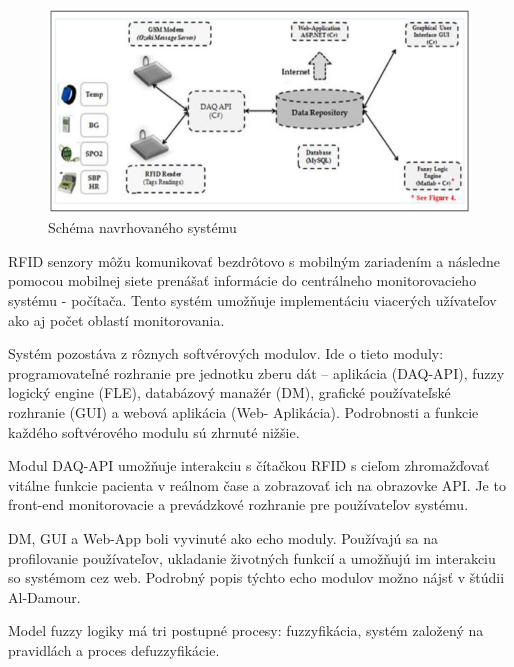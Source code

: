 \begin{figure}[H]
\centering
\includegraphics[scale=0.75]{scheme-fuzzy.png}
\caption{Schéma navrhovaného systému \cite{2019}}
\label{schema}
\end{figure}

RFID senzory môžu komunikovať bezdrôtovo s mobilným zariadením a následne pomocou mobilnej siete prenášať informácie do centrálneho monitorovacieho systému - počítača. Tento systém umožňuje implementáciu viacerých užívateľov ako aj počet oblastí monitorovania. \cite{2019} 

Systém pozostáva z rôznych softvérových modulov. Ide o tieto moduly: programovateľné rozhranie pre jednotku zberu dát – aplikácia (DAQ-API), fuzzy logický engine (FLE), databázový manažér (DM), grafické používateľské rozhranie (GUI) a webová aplikácia (Web- Aplikácia). Podrobnosti a funkcie každého softvérového modulu sú zhrnuté nižšie. \cite{2019}

Modul DAQ-API umožňuje interakciu s čítačkou RFID s cieľom zhromažďovať vitálne funkcie pacienta v reálnom čase a zobrazovať ich na obrazovke API. Je to front-end monitorovacie a prevádzkové rozhranie pre používateľov systému.\cite{2019}

DM, GUI a Web-App boli vyvinuté ako echo moduly. Používajú sa na profilovanie používateľov, ukladanie životných funkcií a umožňujú im interakciu so systémom cez web. Podrobný popis týchto echo modulov možno nájsť v štúdii Al-Damour\cite{2013}.\cite{2019}

Model fuzzy logiky má tri postupné procesy: fuzzyfikácia, systém založený na pravidlách a proces defuzzyfikácie.\cite{2019}

